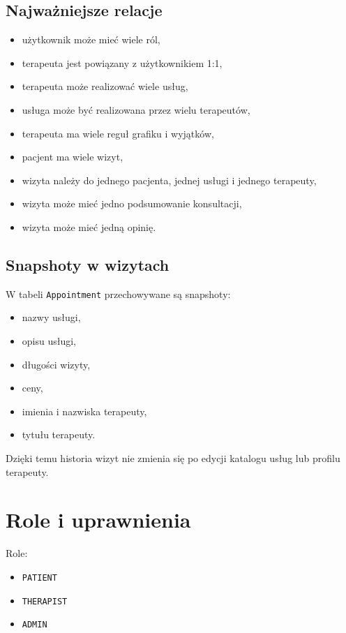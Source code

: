 \documentclass[11pt,a4paper]{article}
\begin{document}
\subsection{Najważniejsze relacje}

\begin{itemize}[leftmargin=1.2cm]
    \item użytkownik może mieć wiele ról,
    \item terapeuta jest powiązany z użytkownikiem 1:1,
    \item terapeuta może realizować wiele usług,
    \item usługa może być realizowana przez wielu terapeutów,
    \item terapeuta ma wiele reguł grafiku i wyjątków,
    \item pacjent ma wiele wizyt,
    \item wizyta należy do jednego pacjenta, jednej usługi i jednego terapeuty,
    \item wizyta może mieć jedno podsumowanie konsultacji,
    \item wizyta może mieć jedną opinię.
\end{itemize}

\subsection{Snapshoty w wizytach}

W tabeli \texttt{Appointment} przechowywane są snapshoty:
\begin{itemize}[leftmargin=1.2cm]
    \item nazwy usługi,
    \item opisu usługi,
    \item długości wizyty,
    \item ceny,
    \item imienia i nazwiska terapeuty,
    \item tytułu terapeuty.
\end{itemize}

Dzięki temu historia wizyt nie zmienia się po edycji katalogu usług lub profilu terapeuty.

\section{Role i uprawnienia}

Role:
\begin{itemize}[leftmargin=1.2cm]
    \item \texttt{PATIENT}
    \item \texttt{THERAPIST}
    \item \texttt{ADMIN}
\end{itemize}
\end{document}
